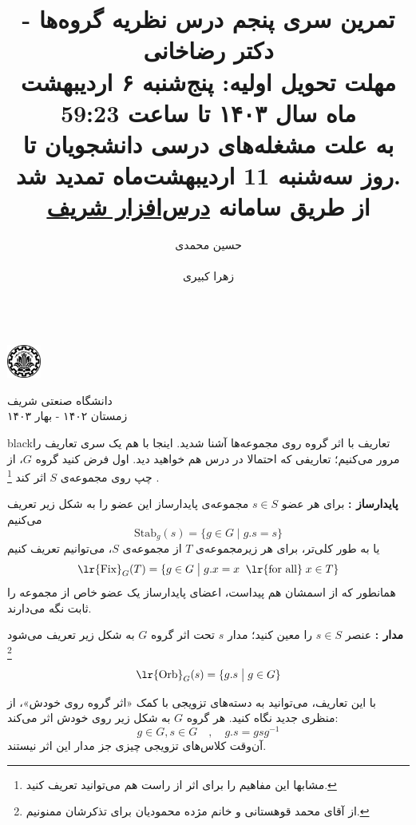 \documentclass{article}
\title{
	\vspace{-0.8em}
تمرین سری پنجم درس نظریه گروه‌ها - دکتر رضاخانی
\\
{\normalsize
\textbf{مهلت تحویل اولیه:
پنج‌شنبه ۶ اردیبهشت ماه
 سال ۱۴۰۳ تا ساعت 59:23
\\
{
\small \color{red}
به علت مشغله‌های درسی دانشجویان تا روز سه‌شنبه 11 اردیبهشت‌ماه تمدید شد.
}
\\
\vspace{-0.4em}
از طریق سامانه
\href{https://cw.sharif.edu/}{درس‌افزار شریف}
}
}
\vspace{-0.6em}
}
\author{
حسین محمدی\\
  \lr{
  		\href{mailto:hossein.mohammadi.imp@gmail.com}{\texttt{	hossein.mohammadi.imp@gmail.com}}} \\
  \And
  زهرا کبیری\\
 \lr{
  		\href{mailto:kabiri.zahra98@gmail.com}{ \texttt{kabiri.zahra98@gmail.com}}}\\
  }
\begin{document}
\begin{minipage}{0.1\textwidth}%
\includegraphics[width=1.1cm]{sharif-logo.png}
\end{minipage}%
\hfill%
\begin{minipage}{0.9\textwidth}\raggedleft
دانشگاه صنعتی شریف\\
زمستان ۱۴۰۲ - بهار ۱۴۰۳\\
\end{minipage}

\makepertitle

\begin{boxes}{black}{تعاریف}
	با اثر گروه روی مجموعه‌ها آشنا شدید. اینجا با هم یک سری تعاریف را مرور می‌کنیم؛ تعاریفی که احتمالا در درس هم خواهید دید. اول فرض کنید گروه $G$، از چپ روی مجموعه‌ی $S$ اثر کند
	\footnote{مشابها این مفاهیم را برای اثر از راست هم می‌توانید تعریف کنید.}
	. 
	
	\textbf{پایدارساز
	:
	}
	برای هر عضو $s\in S$ مجموعه‌ی پایدارساز این عضو را به شکل زیر تعریف می‌کنیم
	\[
	\text{Stab}_g(s) = \{g\in G \; \big| \; g.s=s\}
	\]
	یا به طور کلی‌تر، برای هر زیرمجموعه‌ی $T$ از مجموعه‌ی $S$، می‌توانیم تعریف کنیم
	\[
	\text{\lr{Fix}}_G(T) = \{g \in G \;\big|\; g.x = x \;\; \text{\lr{for all}}\; x \in T\}
	\]
	همانطور که از اسمشان هم پیداست، اعضای پایدارساز  یک عضو خاص از مجموعه را ثابت نگه می‌دارند.
	
	\textbf{مدار
	:}
	 عنصر 
	$s\in S$ را 
	معین کنید؛ مدار $s$ تحت اثر گروه 
	$G$ به شکل زیر تعریف می‌شود
	\footnote{از آقای محمد قوهستانی و خانم مژده محمودیان برای تذکرشان ممنونیم.}
	\[
	\text{\lr{Orb}}_G(s) = \{ g.s \; \big| \; g \in G\}
	\]
	
	با این تعاریف، می‌توانید به دسته‌های تزویجی با کمک «اثر گروه روی خودش»، از منظری جدید نگاه کنید. هر گروه $G$ به شکل زیر روی خودش اثر می‌کند:
	\[
	 g\in G , s \in G \quad,\quad g.s = gsg^{-1}
	\]
	آن‌وقت کلاس‌های تزویجی چیزی جز مدار این اثر نیستند.

\end{boxes}
\end{document}
